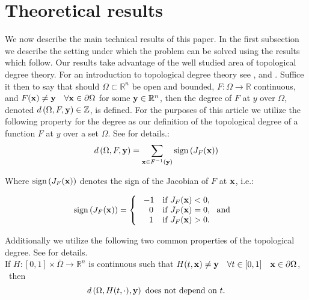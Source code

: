 \section{Theoretical results} \label{sec:theores}

We now describe the main technical results of this paper. 
In the first subsection we describe the setting under which the problem can be solved using the results which follow. Our results take advantage of the well studied area of topological degree theory. 
For an introduction to topological degree theory see \cite{OrChCh2006}, \cite{fonseca1995degree} and \cite{MoVrYa2002}. 
Suffice it then to say that should $\Omega\subset\mathbb{R}^{n}$ be open and bounded, $F:\Omega\rightarrow \mathbb{R}$ continuous, and $F(\bold x)\neq \bold y \quad \forall \bold x\in\partial\Omega$ for some $\bold y\in\mathbb{R}^n$, then the degree of $F$ at $y$ over $\Omega$, denoted $d\left(\Omega,F,\bold y\right)\in\mathbb{Z}$, is defined. 
For the purposes of this article we utilize the following property for the degree as our definition of the topological degree of a function $F$ at $y$ over a set $\Omega$. 
See \cite{OrChCh2006} for details.:
\begin{equation}\label{eq:Deg3}
d\left(\Omega,F,\bold y\right)=\sum\limits_{\bold x\in F^{-1}(\bold y)}\operatorname{sign}\left(J_F(\bold x)\right)
\end{equation}

Where $\operatorname{sign}\left(J_F(\bold x)\right)$ denotes the sign of the Jacobian of $F$ at $\bold x$, i.e.:

\[\operatorname{sign}\left(J_F(\bold x)\right)=   \left\{
\begin{array}{ll}
       \ -1   & \mbox{if } J_F(\bold x)< 0, \\
      \quad 0 & \mbox{if } J_F(\bold x)= 0,~\mbox{ and } \\
      \quad 1 & \mbox{if } J_F(\bold x)> 0. \\
\end{array} 
\right. \]

Additionally we utilize the following two common properties of the topological degree. 
See \cite{OrChCh2006} for details. \\
If $H : [0,1]\times\bar{\Omega}\rightarrow\mathbb{R}^n$ is continuous such that $H(t,\bold x)\neq \bold y \quad \forall t\in[0,1]\quad \bold x\in\partial\Omega$,   \ then 
\begin{equation}\label{eq:Deg1} 
d\left(\Omega,H(t,\cdot),\bold y\right)\text{ does not depend on }t.
\end{equation}

